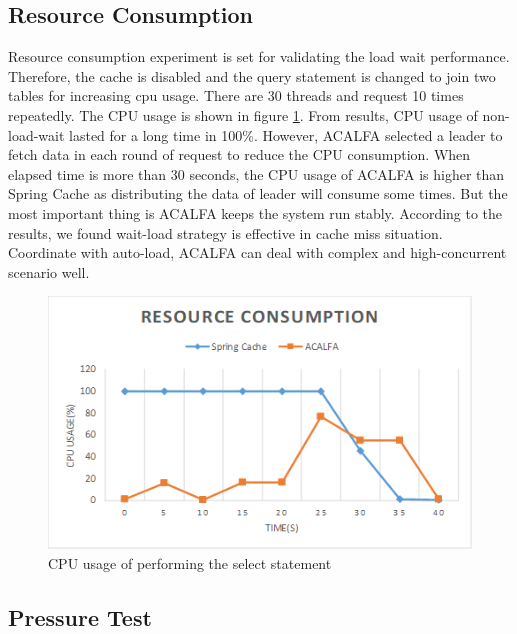 \documentclass{singlecol-new}
\theoremstyle{TH}{
\newtheorem{lemma}{Lemma}
\newtheorem{theorem}[lemma]{Theorem}
\newtheorem{corrolary}[lemma]{Corrolary}
\newtheorem{conjecture}[lemma]{Conjecture}
\newtheorem{proposition}[lemma]{Proposition}
\newtheorem{claim}[lemma]{Claim}
\newtheorem{stheorem}[lemma]{Wrong Theorem}
}
\theoremstyle{THrm}{
\newtheorem{definition}{Definition}[section]
\newtheorem{question}{Question}[section]
\newtheorem{remark}{Remark}
\newtheorem{scheme}{Scheme}
}
\theoremstyle{THhit}{
\newtheorem{case}{Case}[section]
}
\begin{document}
\subsection{Resource Consumption}

Resource consumption experiment is set for validating the load wait performance. Therefore, the cache is disabled and the query statement is changed to join two tables for increasing cpu usage. There are 30 threads and request 10 times repeatedly. The CPU usage is shown in figure \ref{resource}. From results, CPU usage of non-load-wait lasted for a long time in 100\%. However, ACALFA selected a leader to fetch data in each round of request to reduce the CPU consumption. When elapsed time is more than 30 seconds, the CPU usage of ACALFA is higher than Spring Cache as distributing the data of leader will consume some times. But the most important thing is ACALFA keeps the system run stably. According to the results, we found wait-load strategy is effective in cache miss situation. Coordinate with auto-load, ACALFA can deal with complex and high-concurrent scenario well.

\begin{figure} [htb]
    \centering
    \includegraphics[width=1\linewidth]{img/resource.png}
    \caption{CPU usage of performing the select statement}
    \label{resource}
\end{figure}

\subsection{Pressure Test}
\end{document}
